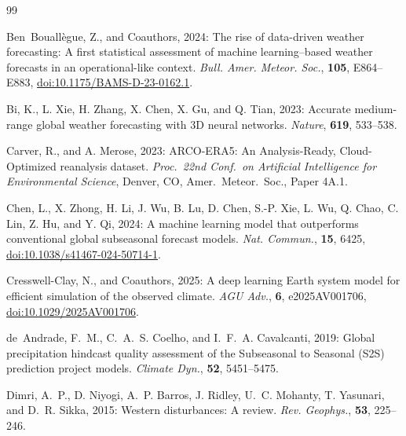 \documentclass[11pt]{article}
\providecommand{\doi}[1]{\href{https://doi.org/#1}{doi:#1}}
\begin{document}
\begin{thebibliography}{99}

Ben~Bouall\`egue, Z., and Coauthors, 2024: The rise of data-driven
weather forecasting: A first statistical assessment of machine
learning--based weather forecasts in an operational-like context.
\textit{Bull. Amer. Meteor. Soc.}, \textbf{105}, E864--E883,
\doi{10.1175/BAMS-D-23-0162.1}.

Bi, K., L. Xie, H. Zhang, X. Chen, X. Gu, and Q. Tian, 2023: Accurate
medium-range global weather forecasting with 3D neural networks.
\textit{Nature}, \textbf{619}, 533--538.

Carver, R., and A. Merose, 2023: ARCO-ERA5: An Analysis-Ready,
Cloud-Optimized reanalysis dataset. \textit{Proc.\ 22nd Conf.\ on
Artificial Intelligence for Environmental Science}, Denver, CO,
Amer.\ Meteor.\ Soc., Paper 4A.1.

Chen, L., X. Zhong, H. Li, J. Wu, B. Lu, D. Chen, S.-P. Xie, L. Wu,
Q. Chao, C. Lin, Z. Hu, and Y. Qi, 2024: A machine learning model
that outperforms conventional global subseasonal forecast models.
\textit{Nat. Commun.}, \textbf{15}, 6425,
\doi{10.1038/s41467-024-50714-1}.

Cresswell-Clay, N., and Coauthors, 2025: A deep learning Earth system
model for efficient simulation of the observed climate.
\textit{AGU Adv.}, \textbf{6}, e2025AV001706,
\doi{10.1029/2025AV001706}.

de~Andrade, F.~M., C.~A.~S. Coelho, and I.~F.~A. Cavalcanti, 2019:
Global precipitation hindcast quality assessment of the Subseasonal
to Seasonal (S2S) prediction project models. \textit{Climate Dyn.},
\textbf{52}, 5451--5475.

Dimri, A.~P., D. Niyogi, A.~P. Barros, J. Ridley, U.~C. Mohanty,
T. Yasunari, and D.~R. Sikka, 2015: Western disturbances: A review.
\textit{Rev. Geophys.}, \textbf{53}, 225--246.


\end{thebibliography}
\end{document}
